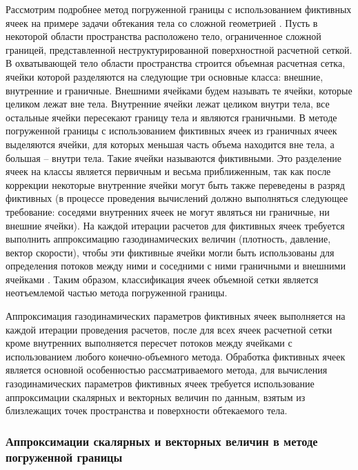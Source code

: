 Рассмотрим подробнее метод погруженной границы с использованием фиктивных ячеек \cite{Peter2016Immersed} на примере задачи обтекания тела со сложной геометрией \cite{Rybakov2020GeoIBM}.
Пусть в некоторой области пространства расположено тело, ограниченное сложной границей, представленной неструктурированной поверхностной расчетной сеткой.
В охватывающей тело области пространства строится объемная расчетная сетка, ячейки которой разделяются на следующие три основные класса: внешние, внутренние и граничные.
Внешними ячейками будем называть те ячейки, которые целиком лежат вне тела.
Внутренние ячейки лежат целиком внутри тела, все остальные ячейки пересекают границу тела и являются граничными.
В методе погруженной границы с использованием фиктивных ячеек из граничных ячеек выделяются ячейки, для которых меньшая часть объема находится вне тела, а большая -- внутри тела.
Такие ячейки называются фиктивными.
Это разделение ячеек на классы является первичным и весьма приближенным, так как после коррекции некоторые внутренние ячейки могут быть также переведены в разряд фиктивных (в процессе проведения вычислений должно выполняться следующее требование: соседями внутренних ячеек не могут являться ни граничные, ни внешние ячейки).
На каждой итерации расчетов для фиктивных ячеек требуется выполнить аппроксимацию газодинамических величин (плотность, давление, вектор скорости), чтобы эти фиктивные ячейки могли быть использованы для определения потоков между ними и соседними с ними граничными и внешними ячейками \cite{Vinnikov2007Immersed}.
Таким образом, классификация ячеек объемной сетки является неотъемлемой частью метода погруженной границы.

Аппроксимация газодинамических параметров фиктивных ячеек выполняется на каждой итерации проведения расчетов, после для всех ячеек расчетной сетки кроме внутренних выполняется пересчет потоков между ячейками с использованием любого конечно-объемного метода.
Обработка фиктивных ячеек является основной особенностью рассматриваемого метода, для вычисления газодинамических параметров фиктивных ячеек требуется использование аппроксимации скалярных и векторных величин по данным, взятым из близлежащих точек пространства и поверхности обтекаемого тела.

\subsubsection{Аппроксимации скалярных и векторных величин в методе погруженной границы}

